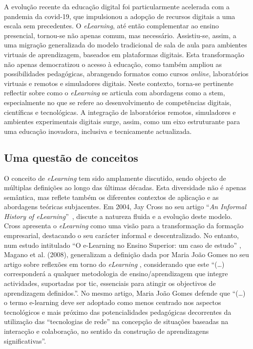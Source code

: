 A evolução recente da educação digital foi particularmente acelerada com a pandemia da \acrshort{covid-19}, que impulsionou a adopção de recursos digitais a uma escala sem precedentes. O \textit{eLearning}, até então complementar ao ensino presencial, tornou-se não apenas comum, mas necessário. Assistiu-se, assim, a uma migração generalizada do modelo tradicional de sala de aula para ambientes virtuais de aprendizagem, baseados em plataformas digitais. Esta transformação não apenas democratizou o acesso à educação, como também ampliou as possibilidades pedagógicas, abrangendo formatos como cursos \textit{online}, laboratórios virtuais e remotos e simuladores digitais. Neste contexto, torna-se pertinente reflectir sobre como o \textit{eLearning} se articula com abordagens como a \acrshort{stem}, especialmente no que se refere ao desenvolvimento de competências digitais, científicas e tecnológicas. A integração de laboratórios remotos, simuladores e ambientes experimentais digitais surge, assim, como um eixo estruturante para uma educação inovadora, inclusiva e tecnicamente actualizada.

\subsection{Uma questão de conceitos}
O conceito de \textit{eLearning} tem sido amplamente discutido, sendo objecto de múltiplas definições ao longo das últimas décadas. Esta diversidade não é apenas semântica, mas reflete também os diferentes contextos de aplicação e as abordagens teóricas subjacentes. Em 2004, Jay Cross no seu artigo ``\textit{An Informal History of eLearning}''~\cite{jaycross}, discute a natureza fluida e a evolução deste modelo. Cross apresenta o \textit{eLearning} como uma visão para a transformação da formação empresarial, destacando o seu carácter informal e descentralizado.  No entanto, num estudo intitulado ``O e-Learning no Ensino Superior: um caso de estudo'' \cite{eLearningenssup}, Magano et al. (2008), generalizam a definição dada por Maria João Gomes no seu artigo sobre reflexões em torno do \textit{eLearning} \cite{gomes_e-learning_2005}, considerando que este ``(\ldots) corresponderá a qualquer metodologia de ensino/aprendizagem que integre actividades, suportadas por \acrshort{tic}, essenciais para atingir os objectivos de aprendizagem definidos.''. No mesmo artigo, Maria João Gomes defende que ``(\ldots) o termo e-learning deve ser adoptado como menos centrado nos aspectos tecnológicos e mais próximo das potencialidades pedagógicas decorrentes da utilização das ``tecnologias de rede'' na concepção de situações baseadas na interacção e colaboração, no sentido da construção de aprendizagens significativas''.

